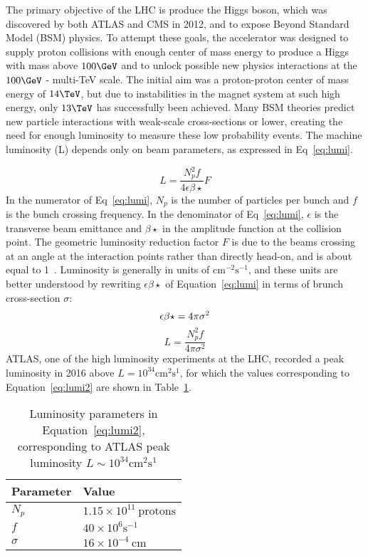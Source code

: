 The primary objective of the LHC is produce the Higgs boson, which was discovered by both ATLAS and CMS in 2012, and to expose Beyond Standard Model (BSM) physics.  To attempt these goals, the accelerator was designed to supply proton collisions with enough center of mass energy to produce a Higgs with mass above $100\GeV$ and to unlock possible new physics interactions at the $100\GeV$ - multi-TeV scale.  The initial aim was a proton-proton center of mass energy of $14 \TeV$, but due to instabilities in the magnet system at such high energy, only $13\TeV$ has successfully been achieved.  Many BSM theories predict new particle interactions with weak-scale cross-sections or lower, creating the need for enough luminosity to measure these low probability events.  The machine luminosity (L) depends only on beam parameters, as expressed in Eq~\ref{eq:lumi}.

\begin{equation}
L=\frac{N_p^2f}{4\epsilon\beta\star}F
\label{eq:lumi}
\end{equation}
In the numerator of Eq~\ref{eq:lumi}, $N_p$ is the number of particles per bunch and $f$ is the bunch crossing frequency.  In the denominator of Eq~\ref{eq:lumi}, $\epsilon$ is the transverse beam emittance and $\beta\star$ in the amplitude function at the collision point.  The geometric luminosity reduction factor $F$ is due to the beams crossing at an angle at the interaction points rather than directly head-on, and is about equal to 1~\cite{cid}.  Luminosity is generally in units of $\mathrm{cm}^{-2}\mathrm{s}^{-1}$, and these units are better understood by rewriting $\epsilon\beta\star$ of Equation~\ref{eq:lumi} in terms of brunch cross-section $\sigma$:
\begin{equation}
\epsilon\beta\star=4\pi\sigma^2\\
\label{eq:eb}
\end{equation} 
\begin{equation}
L=\frac{N_p^2f}{4\pi\sigma^2}
\label{eq:lumi2}
\end{equation} 
 ATLAS, one of the high luminosity experiments at the LHC, recorded a peak luminosity in 2016 above $L=10^{34}\mathrm{cm}^2\mathrm{s}^1$, for which the values corresponding to Equation~\ref{eq:lumi2} are shown in Table~\ref{tab:lumi}.
\begin{table}[!htb]
\centering
\small
\begin{tabular}{ll}
Parameter  & Value  \\
\hline \hline
$N_p$ & $1.15\times 10^{11}~\mathrm{protons}$ \\ 
$f$ & $40\times10^{6}\mathrm{s}^{-1}$ \\  
$\sigma$& $16\times10^{-4}~\mathrm{cm}$   \\
\hline 
\end{tabular}
\caption{Luminosity parameters in Equation~\ref{eq:lumi2}, corresponding to ATLAS peak luminosity $L\sim10^{34}\mathrm{cm}^2\mathrm{s}^1$}
\label{tab:lumi}
\end{table} 

